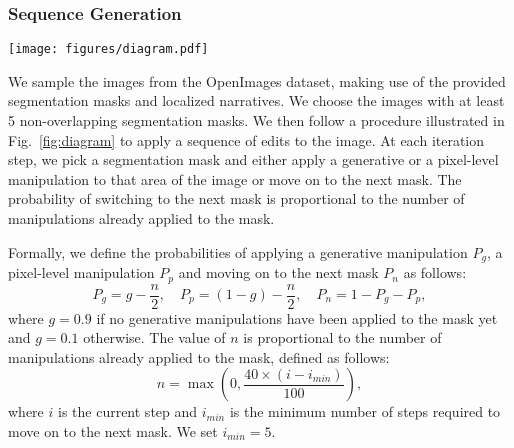 \documentclass[10pt,twocolumn,letterpaper]{article}
\begin{document}
\subsubsection{Sequence Generation}


\begin{figure*}[ht]
    \centering
    \texttt{[image: figures/diagram.pdf]}
    \caption{The diagram of the sequence generation process. For each image,
         we first go through up to 15 segmentation masks and apply edits, chosen
         randomly, where the probabilities of choices depend on the number
           of edits already applied to the mask. The probability of applying a 
           generative manipulation is greatly lowered if a generative manipulation
               has already been applied. This lowers, but does not eliminate, the
               chance of making destructive or mutually exclusive manipulations.}
    \label{fig:diagram}
\end{figure*}


We sample the images from the OpenImages dataset, making use of the provided
segmentation masks and localized narratives. We choose the images with at
least 5 non-overlapping segmentation masks. We then follow a procedure
illustrated in Fig.~\ref{fig:diagram} to apply a sequence of edits to the image. At each
iteration step, we pick a segmentation mask and either apply a generative or a
pixel-level manipulation to that area of the image or move on to the next mask.
The probability of switching to the next mask is proportional to the number of
manipulations already applied to the mask.

Formally, we define the probabilities of applying a generative manipulation $P_g$,
a pixel-level manipulation $P_p$ and moving on to the next mask $P_n$ as follows:
\begin{equation}
     P_g = g - \frac{n}{2}, \quad P_p = (1 - g) - \frac{n}{2}, \quad P_n = 1 - P_g - P_p,
\end{equation}
where $g = 0.9$ if no generative manipulations have been applied to the mask
yet and $g = 0.1$ otherwise. The value of $n$ is proportional to the number of
manipulations already applied to the mask, defined as follows:
\begin{equation}
     n = \max(0, \frac{40 \times (i - i_{min})}{100}),
\end{equation}
where $i$ is the current step and $i_{min}$ is the minimum number of steps
required to move on to the next mask. We set $i_{min} = 5$.
\end{document}
